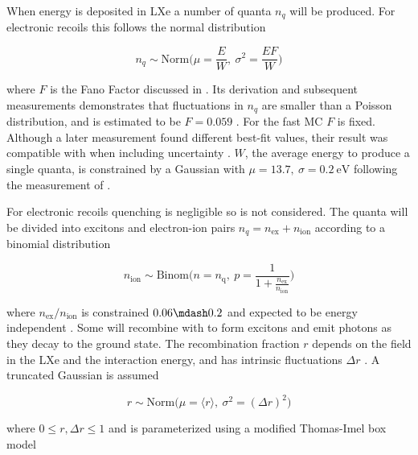 When energy is deposited in LXe a number of quanta $n_q$ will be produced.  For electronic recoils this follows the normal distribution

\begin{equation}
n_q \sim \mathrm{Norm} \bigg( \mu = \frac{E}{W},\ \sigma^2 = \frac{E F}{W} \bigg)
\label{eq:er_nr_calibrations_parameter_determ_er_quanta}
\end{equation}

\noindent where $F$ is the Fano Factor  discussed in .  Its derivation and subsequent measurements
demonstrates that fluctuations in $n_q$ are smaller than a Poisson distribution, and is estimated to be $F = 0.059$
.  For the
fast MC $F$ is fixed.  Although a later measurement found different best-fit values, their result was
compatible with  when including uncertainty .  $W$, the average energy to produce a single
quanta, is constrained by a Gaussian with $\mu = 13.7,\ \sigma = 0.2\ \mathrm{eV}$ following the measurement of .

For electronic recoils quenching is negligible so is not considered.  The quanta will be divided into excitons and electron-ion pairs
$n_q = n_{\mathrm{ex}} + n_{\mathrm{ion}}$ according to a binomial distribution

\begin{equation}
n_{\mathrm{ion}} \sim \mathrm{Binom} \Bigg(n = n_{\mathrm{q}},\ p = \frac{1}{1 + \frac{n_{\mathrm{ex}}}{n_{\mathrm{ion}}}} \Bigg)
\label{eq:er_nr_calibrations_parameter_determ_er_nions}
\end{equation}

\noindent where $n_{\mathrm{ex}} / n_{\mathrm{ion}}$ is constrained $0.06 \mdash 0.2$ and expected to be energy independent
.  Some \electron will recombine with  to form
excitons and emit photons as they decay to the ground state.  The recombination fraction $r$ depends on the field in the LXe and the
interaction energy, and has intrinsic fluctuations $\Delta r$ .  A truncated Gaussian is assumed

\begin{equation}
r \sim \mathrm{Norm} \Big( \mu = \langle r \rangle,\ \sigma^2 = (\Delta r)^2 \Big)
\end{equation}

\noindent where $0 \leq r, \Delta r \leq 1$ and is parameterized using a modified Thomas-Imel box model 


